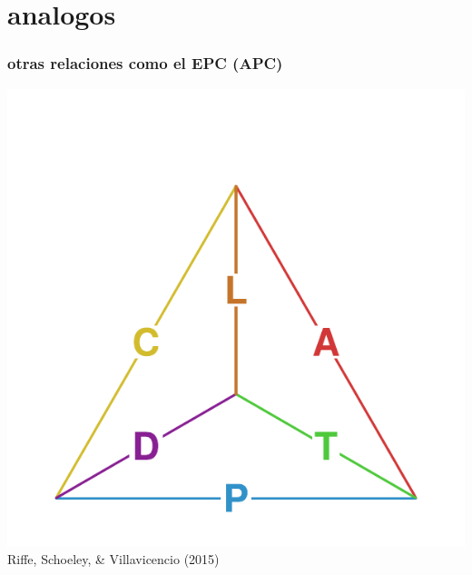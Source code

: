 \documentclass[20pt]{beamer}
\begin{document}
\section{analogos}
\begin{frame}
\frametitle{otras relaciones como el EPC (APC)}
\hspace{2cm}\includegraphics[scale=1.4]{Figures/TetraHedronEdgesOnly.pdf}\\
Riffe, Schoeley, \& Villavicencio (2015)
\end{frame}
\end{document}

